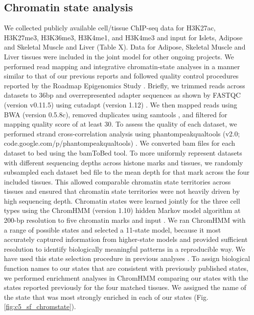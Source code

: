\subsection{Chromatin state analysis}
We collected publicly available cell/tissue ChIP-seq data for H3K27ac, H3K27me3, H3K36me3, H3K4me1, and H3K4me3 and input for Islets, Adipose and Skeletal Muscle and Liver (Table X). Data for Adipose, Skeletal Muscle and Liver tissues were included in the joint model for other ongoing projects. We performed read mapping and integrative chromatin-state analyses in a manner similar to that of our previous reports  and followed quality control procedures reported by the Roadmap Epigenomics Study \cite{consortiumIntegrativeAnalysis1112015}. Briefly, we trimmed reads across datasets to 36bp and overrepresented adapter sequences as shown by FASTQC (version v0.11.5) \cite{s.andrewsFastQCQualityControl} using cutadapt (version 1.12) \cite{martinCutadaptRemovesAdapter2011}. We then mapped reads using BWA (version 0.5.8c), removed duplicates using samtools \cite{liSequenceAlignmentMap2009}, and filtered for mapping quality score of at least 30. To assess the quality of each dataset, we performed strand cross-correlation analysis using phantompeakqualtools (v2.0; code.google.com/p/phantompeakqualtools) \cite{landtChIPseqGuidelinesPractices2012}. We converted bam files for each dataset to bed using the bamToBed tool. To more uniformly represent datasets with different sequencing depths across histone marks and tissues, we randomly subsampled each dataset bed file to the mean depth for that mark across the four included tissues. This allowed comparable chromatin state territories across tissues and ensured that chromatin state territories were not heavily driven by high sequencing depth. Chromatin states were learned jointly for the three cell types using the ChromHMM (version 1.10) hidden Markov model algorithm at 200-bp resolution to five chromatin marks and input \cite{ernstDiscoveryCharacterizationChromatin2010, ernstMappingAnalysisChromatin2011, ernstChromHMMAutomatingChromatin2012}. We ran ChromHMM with a range of possible states and selected a 11-state model, because it most accurately captured information from higher-state models and provided sufficient resolution to identify biologically meaningful patterns in a reproducible way. We have used this state selection procedure in previous analyses \cite{scottGeneticRegulatorySignature2016, varshneyGeneticRegulatorySignatures2017}. To assign biological function names to our states that are consistent with previously published states, we performed enrichment analyses in ChromHMM comparing our states with the states reported previously \cite{varshneyGeneticRegulatorySignatures2017} for the four matched tissues. We assigned the name of the state that was most strongly enriched in each of our states (Fig. \ref{fig:c5_sf_chromstate}).                 
                

